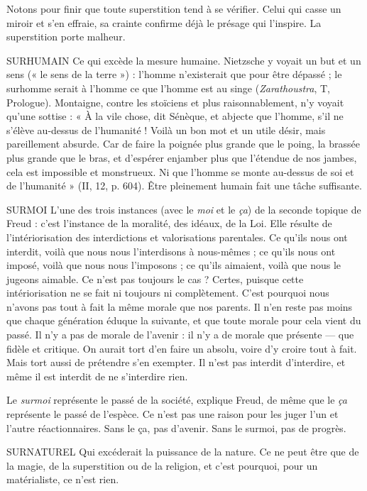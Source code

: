Notons pour finir que toute superstition tend à se vérifier. Celui qui casse
un miroir et s’en effraie, sa crainte confirme déjà le présage qui l’inspire. La
superstition porte malheur.

SURHUMAIN Ce qui excède la mesure humaine. Nietzsche y voyait un but
et un sens (« le sens de la terre ») : l’homme n’existerait que
pour être dépassé ; le surhomme serait à l’homme ce que l’homme est au singe
({\it Zarathoustra}, T, Prologue). Montaigne, contre les stoïciens et plus raisonnablement,
n’y voyait qu’une sottise : « À la vile chose, dit Sénèque, et abjecte que
l’homme, s’il ne s'élève au-dessus de l'humanité ! Voilà un bon mot et un utile
désir, mais pareillement absurde. Car de faire la poignée plus grande que le
poing, la brassée plus grande que le bras, et d’espérer enjamber plus que
l'étendue de nos jambes, cela est impossible et monstrueux. Ni que l’homme se
monte au-dessus de soi et de l'humanité » (II, 12, p. 604). Être pleinement
humain fait une tâche suffisante.

SURMOI L'une des trois instances (avec le {\it moi} et le {\it ça}) de la seconde
topique de Freud : c’est l'instance de la moralité, des idéaux, de la
Loi. Elle résulte de l’intériorisation des interdictions et valorisations parentales.
Ce qu’ils nous ont interdit, voilà que nous nous l’interdisons à nous-mêmes ;
ce qu’ils nous ont imposé, voilà que nous nous l’imposons ; ce qu’ils aimaient,
voilà que nous le jugeons aimable. Ce n’est pas toujours le cas ? Certes, puisque
cette intériorisation ne se fait ni toujours ni complètement. C’est pourquoi
nous n'avons pas tout à fait la même morale que nos parents. Il n’en reste pas
moins que chaque génération éduque la suivante, et que toute morale pour cela
vient du passé. Il n’y a pas de morale de l’avenir : il n’y a de morale que présente —
que fidèle et critique. On aurait tort d’en faire un absolu, voire d’y
croire tout à fait. Mais tort aussi de prétendre s’en exempter. Il n’est pas
interdit d'interdire, et même il est interdit de ne s’interdire rien.

Le {\it surmoi} représente le passé de la société, explique Freud, de même que
le {\it ça} représente le passé de l'espèce. Ce n’est pas une raison pour les juger l’un
et l’autre réactionnaires. Sans le ça, pas d’avenir. Sans le surmoi, pas de progrès.

SURNATUREL Qui excéderait la puissance de la nature. Ce ne peut être
que de la magie, de la superstition ou de la religion, et c’est
pourquoi, pour un matérialiste, ce n’est rien.

